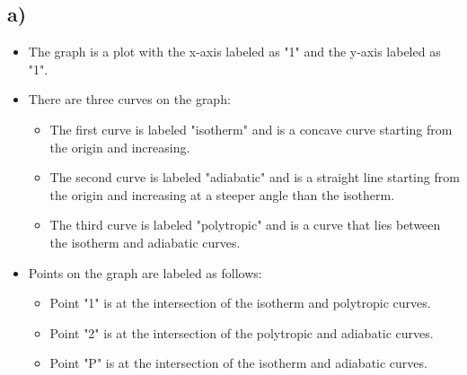 

\subsection*{a)}

\begin{itemize}
    \item The graph is a plot with the x-axis labeled as "1" and the y-axis labeled as "1".
    \item There are three curves on the graph:
        \begin{itemize}
            \item The first curve is labeled "isotherm" and is a concave curve starting from the origin and increasing.
            \item The second curve is labeled "adiabatic" and is a straight line starting from the origin and increasing at a steeper angle than the isotherm.
            \item The third curve is labeled "polytropic" and is a curve that lies between the isotherm and adiabatic curves.
        \end{itemize}
    \item Points on the graph are labeled as follows:
        \begin{itemize}
            \item Point "1" is at the intersection of the isotherm and polytropic curves.
            \item Point "2" is at the intersection of the polytropic and adiabatic curves.
            \item Point "P" is at the intersection of the isotherm and adiabatic curves.
        \end{itemize}
\end{itemize}